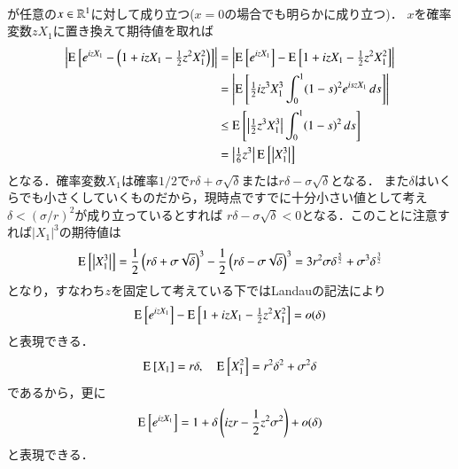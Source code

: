 \begin{description}
\begin{align}
		\end{align}
		が任意の$x \in \mathbb{R}^1$に対して成り立つ($x=0$の場合でも明らかに成り立つ)．
		$x$を確率変数$zX_1$に置き換えて期待値を取れば
		\begin{align}
			\left| \operatorname{E}_{}^{} \left[ e^{izX_1} - \left( 1 + izX_1 - \tfrac{1}{2}z^2X_1^2 \right) \right] \right|
			&= \left| \operatorname{E}_{}^{} \left[ e^{izX_1} \right] - \operatorname{E}_{}^{} \left[ 1 + izX_1 - \tfrac{1}{2}z^2X_1^2 \right] \right| \\
			&= \left| \operatorname{E}_{}^{} \left[ \tfrac{1}{2}iz^3X_1^3 \int_{0}^{1} (1-s)^2e^{iszX_1}\, ds \right] \right| \\
			&\leq \operatorname{E}_{}^{} \left[ \left| \tfrac{1}{2}z^3X_1^3 \right| \int_{0}^{1} (1-s)^2\, ds \right] \\
			&= \left|\tfrac{1}{6}z^3 \right| \operatorname{E}_{}^{} \left[ \left| X_1^3 \right| \right] \\
		\end{align}
		となる．確率変数$X_1$は確率$1/2$で$r \delta + \sigma \sqrt{\delta}$または$r \delta - \sigma \sqrt{\delta}$となる．
		また$\delta$はいくらでも小さくしていくものだから，現時点ですでに十分小さい値として考え$\delta < (\sigma/r)^2$が成り立っているとすれば
		$r \delta - \sigma \sqrt{\delta} < 0$となる．このことに注意すれば$|X_1|^3$の期待値は
		\begin{align}
			\operatorname{E}_{}^{} \left[ \left| X_1^3 \right| \right] 
			= \frac{1}{2}\left(r \delta + \sigma \sqrt{\delta}\right)^3 - \frac{1}{2}\left(r \delta - \sigma \sqrt{\delta}\right)^3
			= 3r^2\sigma \delta^\frac{5}{2} + \sigma^3\delta^\frac{3}{2}
		\end{align}
		となり，すなわち$z$を固定して考えている下ではLandauの記法により
		\begin{align}
			\operatorname{E}_{}^{} \left[ e^{izX_1} \right] - \operatorname{E}_{}^{} \left[ 1 + izX_1 - \tfrac{1}{2}z^2X_1^2 \right] = o(\delta)
		\end{align}
		と表現できる．
		\begin{align}
			\operatorname{E}_{}^{} \left[ X_1 \right] = r \delta, \quad \operatorname{E}_{}^{} \left[ X_1^2 \right] = r^2 \delta^2 + \sigma^2 \delta
		\end{align}
		であるから，更に
		\begin{align}
			\operatorname{E}_{}^{} \left[ e^{izX_1} \right] = 1 + \delta \left(izr - \frac{1}{2}z^2 \sigma^2 \right) + o(\delta)
		\end{align}
		と表現できる．
\end{description}

